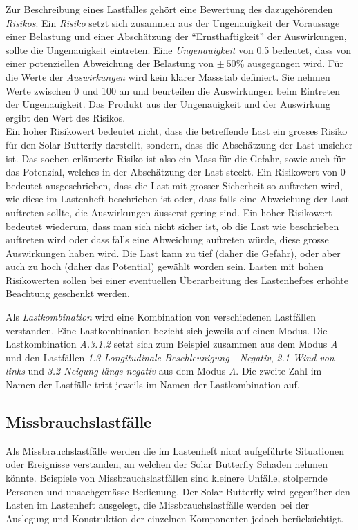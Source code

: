 Zur Beschreibung eines Lastfalles gehört eine Bewertung des dazugehörenden \emph{Risikos}. Ein \emph{Risiko} setzt sich zusammen aus der Ungenauigkeit der Voraussage einer Belastung und einer Abschätzung der ``Ernsthaftigkeit'' der Auswirkungen, sollte die Ungenauigkeit eintreten. Eine \emph{Ungenauigkeit} von 0.5 bedeutet, dass von einer potenziellen Abweichung der Belastung von $\pm\: 50\%$ ausgegangen wird. Für die Werte der \emph{Auswirkungen} wird kein klarer Massstab definiert. Sie nehmen Werte zwischen 0 und 100 an und beurteilen die Auswirkungen beim Eintreten der Ungenauigkeit. Das Produkt aus der Ungenauigkeit und der Auswirkung ergibt den Wert des Risikos.\\
Ein hoher Risikowert bedeutet nicht, dass die betreffende Last ein grosses Risiko für den Solar Butterfly darstellt, sondern, dass die Abschätzung der Last unsicher ist. Das soeben erläuterte Risiko ist also ein Mass für die Gefahr, sowie auch für das Potenzial, welches in der Abschätzung der Last steckt. Ein Risikowert von 0 bedeutet ausgeschrieben, dass die Last mit grosser Sicherheit so auftreten wird, wie diese im Lastenheft beschrieben ist oder, dass falls eine Abweichung der Last auftreten sollte, die Auswirkungen äusserst gering sind. Ein hoher Risikowert bedeutet wiederum, dass man sich nicht sicher ist, ob die Last wie beschrieben auftreten wird oder dass falls eine Abweichung auftreten würde, diese grosse Auswirkungen haben wird. Die Last kann zu tief (daher die Gefahr), oder aber auch zu hoch (daher das Potential) gewählt worden sein. Lasten mit hohen Risikowerten sollen bei einer eventuellen Überarbeitung des Lastenheftes erhöhte Beachtung geschenkt werden.

Als \emph{Lastkombination} wird eine Kombination von verschiedenen Lastfällen verstanden. Eine Lastkombination bezieht sich jeweils auf einen Modus. Die Lastkombination \emph{A.3.1.2} setzt sich zum Beispiel zusammen aus dem Modus \emph{A} und den Lastfällen \emph{1.3 Longitudinale Beschleunigung - Negativ}, \emph{2.1 Wind von links} und \emph{3.2 Neigung längs negativ} aus dem Modus \emph{A}. Die zweite Zahl im Namen der Lastfälle tritt jeweils im Namen der Lastkombination auf.

\subsection{Missbrauchslastfälle}
Als Missbrauchslastfälle werden die im Lastenheft nicht aufgeführte Situationen oder Ereignisse verstanden, an welchen der Solar Butterfly Schaden nehmen könnte. Beispiele von Missbrauchslastfällen sind kleinere Unfälle, stolpernde Personen und unsachgemässe Bedienung. Der Solar Butterfly wird gegenüber den Lasten im Lastenheft ausgelegt, die Missbrauchslastfälle werden bei der Auslegung und Konstruktion der einzelnen Komponenten jedoch berücksichtigt.

